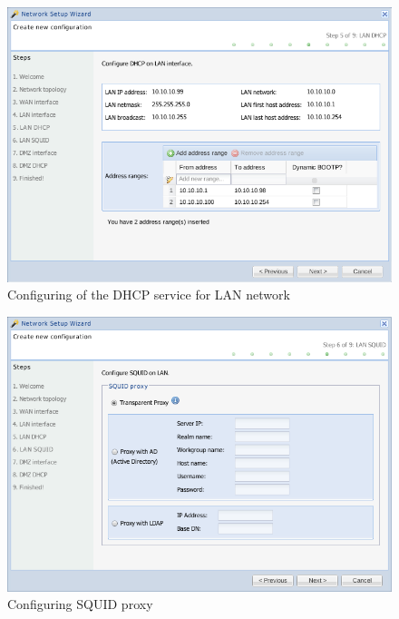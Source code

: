 \begin{figure}[H]
    \begin{center}
    \includegraphics[scale=0.38]{screenshots/etfw/etfw_wizard_05.png}
    \caption{Configuring of the DHCP service for LAN network}
    \label{fig:etfw_wizard_passo5}
    \end{center}
\end{figure}

\begin{figure}[H]
    \begin{center}
    \includegraphics[scale=0.38]{screenshots/etfw/etfw_wizard_06.png}
    \caption{Configuring SQUID proxy}
    \label{fig:etfw_wizard_passo6}
    \end{center}
\end{figure}

